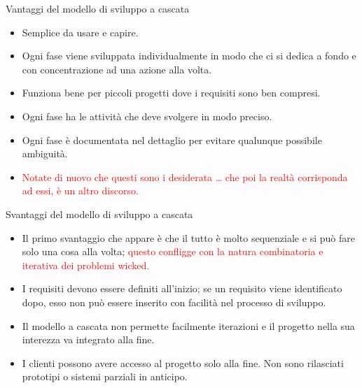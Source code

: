 \documentclass{beamer}
\begin{document}
\begin{frame}{\centerline{Vantaggi del modello di sviluppo a cascata}}


\begin{itemize}
\item  Semplice da usare e capire.

\item  Ogni fase viene sviluppata individualmente in modo che ci si dedica a fondo e con concentrazione ad una azione alla volta.

\item  Funziona bene per piccoli progetti dove i requisiti sono ben compresi.

\item  Ogni fase ha le attivit\`{a} che deve svolgere in modo preciso.

\item  Ogni fase \`{e} documentata nel dettaglio per evitare qualunque possibile ambiguit\`{a}.

\item \textcolor{red}{Notate di nuovo che questi sono i desiderata \ldots{} che poi la realt\`{a} corrisponda ad essi, \`{e} un altro discorso.}

\end{itemize}

\end{frame}
\begin{frame}{\centerline{Svantaggi del modello di sviluppo a cascata}}


\begin{itemize}
\item Il primo svantaggio che appare \`{e} che il tutto \`{e} molto sequenziale e si pu\`{o} fare solo una cosa alla volta; \textcolor{red}{questo confligge con la natura combinatoria e iterativa dei problemi wicked.} 

\item  I requisiti devono essere definiti all'inizio; se un requisito viene identificato dopo, esso non pu\`{o} essere inserito con facilit\`{a} nel processo di sviluppo.


\item Il modello a cascata non permette facilmente iterazioni e il progetto nella sua interezza va integrato alla fine.

\item I clienti possono avere accesso al progetto solo alla fine. Non sono rilasciati prototipi o sistemi parziali in anticipo.
\end{itemize}

\end{frame}
\end{document}
